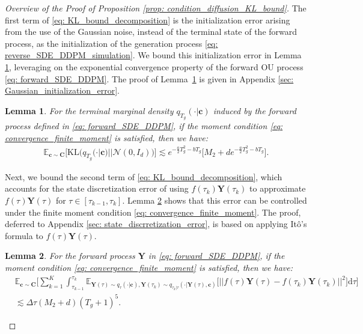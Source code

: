 \documentclass[11pt]{article}
\newtheorem{lemma}{Lemma}
\newcommand{\mE}{\mathbb{E}}
\newcommand{\bY}{\mathbf{Y}}
\newcommand{\bc}{\mathbf{c}}
\newcommand{\bC}{\mathbf{C}}
\newcommand{\KL}{\text{KL}}
\newcommand{\intd}{\mathrm{d}}
\begin{document}
\begin{proof}[Overview of the Proof of Proposition \ref{prop: condition_diffusion_KL_bound}]
The first term of \eqref{eq: KL_bound_decomposition} is the initialization error arising from the use of the Gaussian noise, instead of the terminal state of the forward process, as the initialization of the generation process \eqref{eq: reverse_SDE_DDPM_simulation}. We bound this initialization error in Lemma \ref{lemma: initial_dist_error_bound}, leveraging on the exponential convergence property of the forward OU process \eqref{eq: forward_SDE_DDPM}. The proof of Lemma~\ref{lemma: initial_dist_error_bound} is given in Appendix \ref{sec: Gaussian_initialization_error}.


\begin{lemma}\label{lemma: initial_dist_error_bound}
For the terminal marginal density $q_{T_g}(\cdot | \bc)$ induced by the forward process defined in \eqref{eq: forward_SDE_DDPM}, if the moment condition \eqref{eq: convergence_finite_moment} is satisfied, then we have:
    \begin{align*}
        \mE_{\bc\sim\bC}\bigg[\KL\big(q_{T_g}(\cdot | \bc) || \mathcal{N}(0, I_d)\big)\bigg]\lesssim e^{-\frac{a}{2}T_g^2 - bT_g}\big[M_2 + de^{-\frac{a}{2}T_g^2 - bT_g}\big].
    \end{align*}
\end{lemma}

Next, we bound the second term of \eqref{eq: KL_bound_decomposition}, which accounts for the state discretization error of using $f(\tau_k)\bY(\tau_k)$ to approximate $f(\tau)\bY(\tau)$ for $\tau\in[\tau_{k - 1}, \tau_k]$. Lemma \ref{lemma: state_discrete_error_bound} shows that this error can be controlled under the finite moment condition \eqref{eq: convergence_finite_moment}. The proof, deferred to Appendix \ref{sec: state_discrretization_error}, is based on applying It\^{o}'s formula to $f(\tau)\bY(\tau)$.



\begin{lemma}\label{lemma: state_discrete_error_bound}
    For the forward process $\bY$ in \eqref{eq: forward_SDE_DDPM}, if the moment condition \eqref{eq: convergence_finite_moment} is satisfied, then we have:
    \begin{align*}
    &\mE_{\bc\sim\bC}\bigg[\sum_{k=1}^{K} \int_{\tau_{k -1}}^{\tau_k}\mE_{\bY(\tau)\sim q_\tau(\cdot | \bc), \bY(\tau_k)\sim q_{\tau_k | \tau}(\cdot | \bY(\tau), \bc)}\big[||f(\tau)\bY(\tau) - f(\tau_k)\bY(\tau_k)||^2\big]\intd\tau\bigg] \\
    &\lesssim \Delta\tau(M_2 + d)(T_g + 1)^5.
\end{align*}
\end{lemma}



\end{proof}
\end{document}
